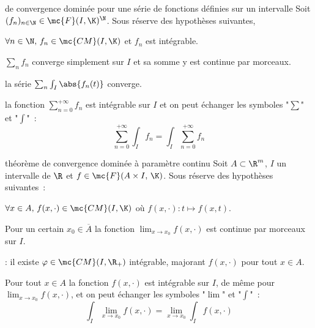 \begin{adjustwidth}{-3cm}{-3cm}
\begin{theoreme}{12.59}{de convergence dominée pour une série de fonctions définies sur un intervalle}
    Soit $(f_n)_{n \in \N} \in \mc{F}(I,\K)^\N$. Sous réserve des hypothèses suivantes,
    \begin{enumeratebf}
        \item $\forall n \in \N,\, f_n \in \mc{CM}(I,\K)$ et $f_n$ est intégrable.
        \item $\sum_n f_n$ converge simplement sur $I$ et sa somme y est continue par morceaux.
        \item la série $\sum_n \int_I \abs{f_n(t)}$ converge.
    \end{enumeratebf}
    la fonction $\displaystyle\sum_{n=0}^{+\infty}f_n$ est intégrable sur $I$ et on peut échanger les symboles "$\sum$" et "$\int$"~:
    $$\sum_{n=0}^{+\infty} \int_I f_n = \int_I \sum_{n=0}^{+\infty} f_n$$
\end{theoreme}

\begin{theoreme}{12.61}{théorème de convergence dominée à paramètre continu}
    Soit $A \subset \R^m$, $I$ un intervalle de $\R$ et $f \in \mc{F}(A\times I,\, \K)$. Sous réserve des hypothèses suivantes~:
    \begin{enumeratebf}
        \item $\forall x \in A,\,  f(x,\cdot) \in \mc{CM}(I,\K)$ où $f(x,\cdot): t \mapsto f(x,t)$.
        \item Pour un certain $x_0 \in \overline{A}$ la fonction $\displaystyle \lim_{x \to x_0}f(x,\cdot)$ est continue par morceaux sur $I$.
        \item {} : il existe $\varphi \in \mc{CM}(I, \R_+)$ intégrable, majorant $f(x,\cdot)$ pour tout $x \in A$.
    \end{enumeratebf}
    Pour tout $x \in A$ la fonction $f(x, \cdot)$ est intégrable sur $I$, de même pour $\displaystyle \lim_{x \to x_0}f(x,\cdot)$, et on peut échanger les symboles "$\lim$" et "$\int$"~:
    $$\int_I \lim_{x \to x_0} f(x,\cdot) = \lim_{x \to x_0} \int_I f(x,\cdot)$$
\end{theoreme}


\end{adjustwidth}
